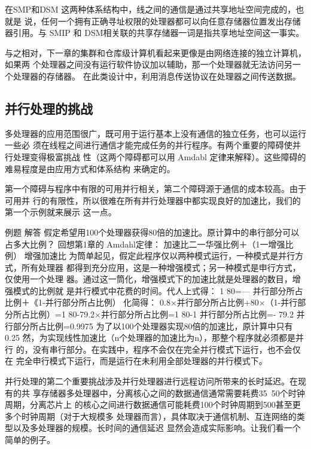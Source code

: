 在SMP和DSM 这两种体系结构中，线之间的通信是通过共享地址空间完成的，也就是
说，任何一个拥有正确寻址权限的处理器都可以向任意存储器位置发出存储器引用。与 SMIP 和
DSM相关联的共享存储器一词是指共享地址空间这一事实。

与之相对，下一章的集群和仓库级计算机看起来更像是由网络连接的独立计算机，如果两
个处理器之间没有运行软件协议加以辅助，那一个处理器就无法访问另一个处理器的存储器。
在此类设计中，利用消息传送协议在处理器之间传送数据。
\subsection{并行处理的挑战}
多处理器的应用范围很广，既可用于运行基本上没有通信的独立任务，也可以运行一些必
须在线程之间进行通信才能完成任务的并行程序。有两个重要的障碍使并行处理变得极富挑战
性（这两个障碍都可以用 Amdabl 定律来解释）。这些障碍的难易程度是由应用方式和体系结构
来确定的。

第一个障碍与程序中有限的可用并行相关，第二个障碍源于通信的成本较高。由于可用并
行的有限性，所以很难在所有并行处理器中都实现良好的加速比，我们的第一个示例就来展示
这一点。

例题
解答
假定希望用100个处理器获得80倍的加速比。原计算中的串行部分可以占多大比例？
回想第1章的 Amdahl定律：
加速比二一华强比例＋（1一增强比例）
增强加速比
为筒单起见，假定此程序仅以两种模式运行，一种模式是并行方式，所有处理器
都得到充分应用，这是一种增强模式；另一种模式是申行方式，仅使用一个处理
器。通过这一筒化，增强模式下的加速比就是处理器的数目，增强模式的比例就
是并行模式中花费的时间。代人上式得：
1
80=—
并行部分所占比例＋《1-并行部分所占比例）
化简得：
0.8×并行部分所占比例+80×（1-并行部分所占比例）=1
80-79.2×并行部分所占比例=1
80-1
并行部分所占比例=-
79.2
并行部分所占比例=0.9975
为了以100个处理器实现80倍的加速比，原计算中只有0.25%
然，为实现线性加速比（n个处理器的加速比为n），那整个程序就必须都是并行
的，没有串行部分。在实践中，程序不会仅在完全并行模式下运行，也不会仅在
完全申行模式下运行，而是运行在未利用全部处理器的并行模式下。

并行处理的第二个重要挑战涉及并行处理器进行远程访问所带来的长时延迟。在现有的共
享存储器多处理器中，分离核心之间的数据通信通常需要耗费35~50个时钟周期，分离芯片上
的核心之间进行数据通信可能耗费100个时钟周期到500甚至更多个时钟周期（对于大规模多
处理器而言），具体取决于通信机制、互连网络的类型以及多处理器的规模。长时间的通信延迟
显然会造成实际影响。让我们看一个简单的例子。

